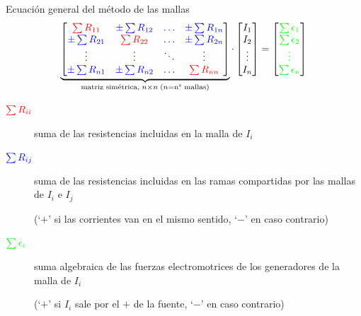 \documentclass[aspectratio=169, xcolor={usenames,svgnames,dvipsnames}]{beamer}
\begin{document}
\begin{frame}{Ecuación general del método de las mallas}
    \begin{equation*}
		\underbrace{\begin{bmatrix}
			{\color{red}\sum R_{11}} &  {\color{blue}\pm\sum R_{12}} & {\color{blue}{\dots}} & {\color{blue}\pm\sum R_{1n}} \\
			{\color{blue}\pm\sum R_{21}} & {\color{red}\sum R_{22}} & {{\dots}} & {\color{blue}\pm\sum R_{2n}} \\
			{\vdots} & {\vdots} &  {\ddots} & \vdots\\
			{\color{blue}\pm\sum R_{n1}} & {\color{blue}\pm\sum R_{n2}} & \dots & {\color{red}\sum R_{nn}}
		\end{bmatrix}}_{\textrm{matriz simétrica}, \; n\times n \; (n=\textrm{n° mallas)}} \cdot 
		\begin{bmatrix}
			I_1\\
			I_2\\
			\vdots\\
			I_n
		\end{bmatrix} = %
		\begin{bmatrix}
			{\color{green}\sum\epsilon_1}\\
			{\color{green}\sum\epsilon_2}\\
			{\color{green}\vdots}\\
			{\color{green}\sum\epsilon_n}
		\end{bmatrix}
	\end{equation*}
    \vspace{-3mm}
    \begin{description}
    \item[{\({\color{red}\sum R_{ii}}\)}] suma de las resistencias incluidas en la malla de \(I_i\)
    
    \item[{\({\color{blue}\sum R_{ij}}\)}] suma de las resistencias incluidas en las ramas compartidas por las mallas de \(I_i\) e \(I_j\) 
    
    (`$+$' si las corrientes van en el mismo sentido, `$-$' en caso contrario)
    
    \item[{\({\color{green}\sum \epsilon_i}\)}] suma algebraica de las fuerzas electromotrices de los generadores de la malla de \(I_i\) 
    
    (`$+$' si $I_i$ sale por el $+$ de la fuente, `$-$' en caso contrario)
    \end{description}
\end{frame}
\end{document}
